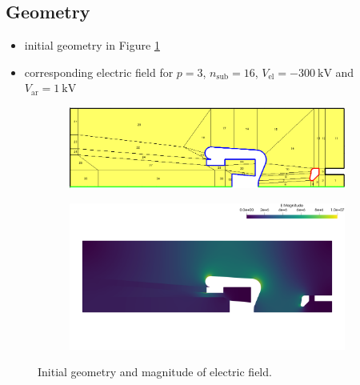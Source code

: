 \subsection{Geometry}
\begin{itemize}
   \item initial geometry in Figure \ref{fig:init}
   \item corresponding electric field for $p=3$, $n_\mathrm{sub}=16$,  $V_\mathrm{el}=-300\ \mathrm{kV}$ and $V_\mathrm{ar}=1\ \mathrm{kV}$
\end{itemize}

\begin{center}
\begin{figure}[H]
   \begin{subfigure}{0.45\textwidth}
      \includegraphics[width=\textwidth]{fig/geometry_v6}
   \end{subfigure}
   \begin{subfigure}{0.45\textwidth}
      \includegraphics[width=\textwidth]{fig/E_v6}
   \end{subfigure}
   \caption{Initial geometry and magnitude of electric field.}
   \label{fig:init}
\end{figure}
\end{center}

